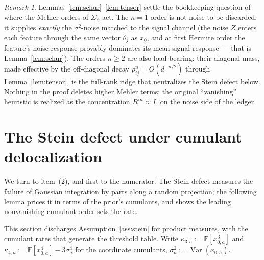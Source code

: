 \documentclass[11pt]{article}
\theoremstyle{remark}
\newtheorem{remark}{Remark}
\newcommand{\E}{\mathbb{E}}
\newcommand{\Var}{\operatorname{Var}}
\begin{document}
\begin{remark}\label{rem:mehler-role}
Lemmas~\ref{lem:schur}--\ref{lem:tensor} settle the bookkeeping question of where the Mehler orders of $\Sigma_\phi$ act. The $n=1$ order is not noise to be discarded: it supplies \emph{exactly} the $\sigma^2$-noise matched to the signal channel (the noise $Z$ enters each feature through the same vector $\theta_j$ as $x_0$, and at first Hermite order the feature's noise response provably dominates its mean signal response --- that is Lemma~\ref{lem:schur}). The orders $n \ge 2$ are also load-bearing: their diagonal mass, made effective by the off-diagonal decay $\rho_{ij}^n = O(d^{-n/2})$ through Lemma~\ref{lem:tensor}, is the full-rank ridge that neutralizes the Stein defect below. Nothing in the proof deletes higher Mehler terms; the original ``vanishing'' heuristic is realized as the concentration $R^{\circ n} \approx I$, on the noise side of the ledger.
\end{remark}

\section{The Stein defect under cumulant delocalization}\label{sec:defect}

We turn to item~(2), and first to the numerator. The Stein defect measures the failure of Gaussian integration by parts along a random projection; the following lemma prices it in terms of the prior's cumulants, and shows the leading nonvanishing cumulant order sets the rate.

This section discharges Assumption~\ref{ass:stein} for product measures, with the cumulant rates that generate the threshold table. Write $\kappa_{3,a} := \E[x_{0,a}^3]$ and $\kappa_{4,a} := \E[x_{0,a}^4] - 3\sigma_a^4$ for the coordinate cumulants, $\sigma_a^2 := \Var(x_{0,a})$.
\end{document}

